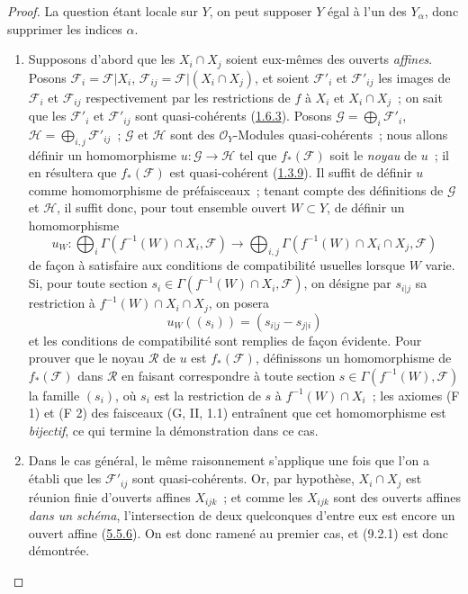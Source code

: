 \begin{proof}
La question étant locale sur $Y$, on peut supposer $Y$ égal à l'un des
$Y_\alpha$, donc supprimer les indices $\alpha$.

\begin{enumerate}
\item[\emph{a)}] Supposons d'abord que les $X_i\cap X_j$ soient eux-mêmes des
ouverts \emph{affines}. Posons
$\mathscr{F}_i=\mathscr{F}|X_i$,
$\mathscr{F}_{ij}=\mathscr{F}|(X_i\cap X_j)$, et soient
$\mathscr{F}'_i$ et $\mathscr{F}'_{ij}$ les images de $\mathscr{F}_i$ et
$\mathscr{F}_{ij}$ respectivement par les restrictions de $f$ à $X_i$ et
$X_i\cap X_j$~; on sait que les $\mathscr{F}'_i$ et
$\mathscr{F}'_{ij}$ sont quasi-cohérents
(\hyperref[I.1.6.3-fr]{1.6.3}). Posons
$\mathscr{G}=\bigoplus_i\mathscr{F}'_i$,
$\mathscr{H}=\bigoplus_{i,j}\mathscr{F}'_{ij}$~; $\mathscr{G}$ et
$\mathscr{H}$ sont des $\mathscr{O}_Y$-Modules quasi-cohérents~; nous allons
définir un homomorphisme $u:\mathscr{G}\to\mathscr{H}$ tel que
$f_*(\mathscr{F})$ soit le \emph{noyau} de $u$~; il en résultera que
$f_*(\mathscr{F})$ est quasi-cohérent
(\hyperref[I.1.3.9-fr]{1.3.9}). Il suffit de définir $u$
comme homomorphisme de préfaisceaux~; tenant compte des définitions de
$\mathscr{G}$ et $\mathscr{H}$, il suffit donc, pour tout ensemble ouvert
$W\subset Y$, de définir un homomorphisme
\[
  u_W:\bigoplus_i\Gamma(f^{-1}(W)\cap X_i,\mathscr{F})
  \longrightarrow
  \bigoplus_{i,j}\Gamma(f^{-1}(W)\cap X_i\cap X_j,\mathscr{F})
\]
de façon à satisfaire aux conditions de compatibilité usuelles lorsque $W$
varie. Si, pour toute section
$s_i\in\Gamma(f^{-1}(W)\cap X_i,\mathscr{F})$, on désigne par $s_{i|j}$ sa
restriction à $f^{-1}(W)\cap X_i\cap X_j$, on posera
\[
  u_W((s_i))=(s_{i|j}-s_{j|i})
\]
et les conditions de compatibilité sont remplies de façon évidente. Pour
prouver que le noyau $\mathscr{R}$ de $u$ est $f_*(\mathscr{F})$, définissons
un homomorphisme de $f_*(\mathscr{F})$ dans $\mathscr{R}$ en faisant
correspondre à toute section $s\in\Gamma(f^{-1}(W),\mathscr{F})$ la famille
$(s_i)$, où $s_i$ est la restriction de $s$ à $f^{-1}(W)\cap X_i$~; les
axiomes (F 1) et (F 2) des faisceaux (G, II, 1.1) entraînent que cet
homomorphisme est \emph{bijectif}, ce qui termine la démonstration dans ce cas.

\item[\emph{b)}] Dans le cas général, le même raisonnement s'applique une fois que
l'on a établi que les $\mathscr{F}'_{ij}$ sont quasi-cohérents. Or, par
hypothèse, $X_i\cap X_j$ est réunion finie d'ouverts affines $X_{ijk}$~; et
comme les $X_{ijk}$ sont des ouverts affines \emph{dans un schéma},
l'intersection de deux quelconques d'entre eux est encore un ouvert affine
(\hyperref[I.5.5.6-fr]{5.5.6}). On est donc ramené au premier cas, et
(9.2.1) est donc démontrée.
\end{enumerate}
\end{proof}

